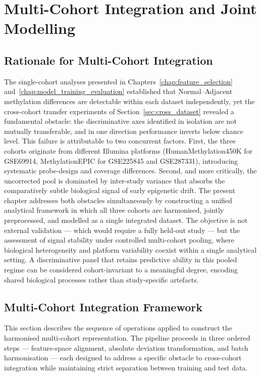 \chapter{Multi-Cohort Integration and Joint Modelling}
\label{chap:multi_cohort_integration}

\section{Rationale for Multi-Cohort Integration}

The single-cohort analyses presented in Chapters~\ref{chap:feature_selection}
and~\ref{chap:model_training_evaluation} established that Normal--Adjacent methylation differences
are detectable within each dataset independently, yet the cross-cohort transfer
experiments of Section~\ref{sec:cross_dataset} revealed a fundamental obstacle:
the discriminative axes identified in isolation are not mutually transferable,
and in one direction performance inverts below chance level.
This failure is attributable to two concurrent factors.
First, the three cohorts originate from different Illumina platforms
(HumanMethylation450K for GSE69914, MethylationEPIC for GSE225845 and GSE287331),
introducing systematic probe-design and coverage differences.
Second, and more critically, the uncorrected pool is dominated by inter-study
variance that absorbs the comparatively subtle biological signal of early
epigenetic drift.
The present chapter addresses both obstacles simultaneously by constructing a
unified analytical framework in which all three cohorts are harmonised,
jointly preprocessed, and modelled as a single integrated dataset.
The objective is not external validation --- which would require a fully held-out
study --- but the assessment of signal stability under controlled multi-cohort
pooling, where biological heterogeneity and platform variability coexist within
a single analytical setting.
A discriminative panel that retains predictive ability in this pooled regime
can be considered cohort-invariant to a meaningful degree, encoding shared
biological processes rather than study-specific artefacts.



\section{Multi-Cohort Integration Framework}
This section describes the sequence of operations applied to construct the harmonised multi-cohort representation. The pipeline proceeds in three ordered steps --- feature-space alignment, absolute deviation transformation, and batch harmonisation --- each designed to address a specific obstacle to cross-cohort integration while maintaining strict separation between training and test data.
